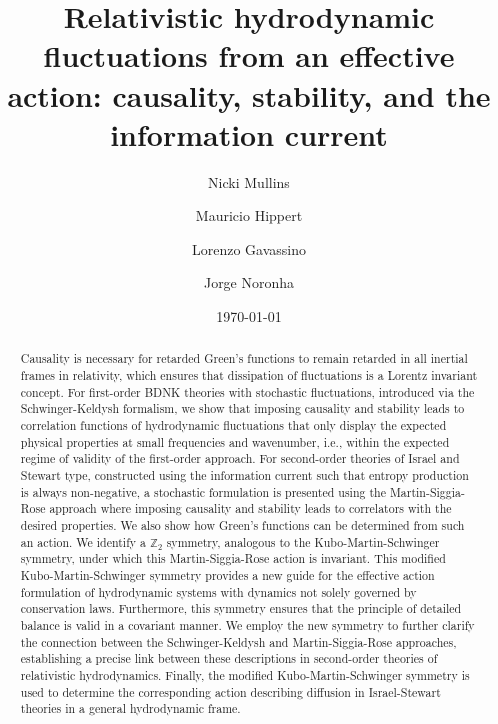 \documentclass[aps,prd,nofootinbib,amsmath,amssymb,showpacs,longbibliography,singlecolumn,superscriptaddress,notitlepage]{revtex4-1}
\theoremstyle{plain}
\theoremstyle{definition}
\begin{document}


\title{Relativistic hydrodynamic fluctuations from an effective action: causality, stability, and the information current}
\date{\today}

\author{Nicki Mullins}

\author{Mauricio Hippert}

\author{Lorenzo Gavassino}


\author{Jorge Noronha}



\begin{abstract}
Causality is necessary for retarded Green's functions to remain retarded in all inertial frames in relativity, which ensures that dissipation of fluctuations is a Lorentz invariant concept. For first-order BDNK theories  with stochastic fluctuations, introduced via the Schwinger-Keldysh formalism, we show that imposing causality and stability leads to correlation functions of hydrodynamic fluctuations that only display the expected physical properties at small frequencies and wavenumber, i.e., within the expected regime of validity of the first-order approach. For second-order theories of Israel and Stewart type, constructed using the information current such that entropy production is always non-negative, a stochastic formulation is presented using the Martin-Siggia-Rose approach where imposing causality and stability leads to correlators with the desired properties. We also show how Green's functions can be determined from such an action. We identify a $\mathds{Z}_2$ symmetry, analogous to the Kubo-Martin-Schwinger symmetry, under which this Martin-Siggia-Rose action is invariant. 
This modified Kubo-Martin-Schwinger symmetry provides a new guide for the effective action formulation of hydrodynamic systems with dynamics not solely governed by conservation laws. Furthermore, this symmetry ensures that the principle of detailed balance is valid in a covariant manner. We employ the new symmetry to further clarify the connection between the Schwinger-Keldysh and Martin-Siggia-Rose approaches, establishing a precise link between these descriptions in second-order theories of  relativistic hydrodynamics. 
Finally, the modified Kubo-Martin-Schwinger symmetry is used to determine the corresponding action describing diffusion in Israel-Stewart theories in a general hydrodynamic frame.  
\end{abstract}
\end{document}

